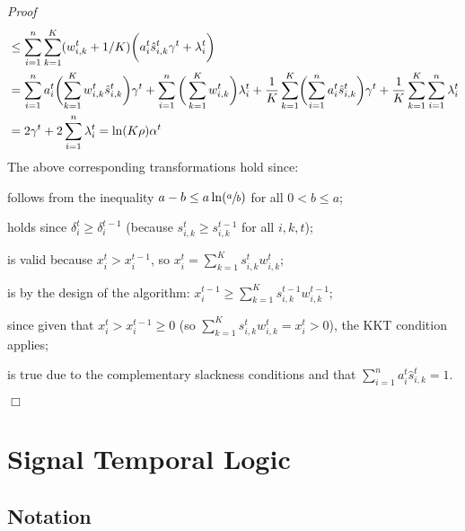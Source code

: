 \documentclass[a4paper]{article}
\newenvironment{proof}{\noindent\emph{Proof\ }}{\hspace*{\fill}$\Box$\medskip}
\begin{document}
\begin{proof}
\begin{align}
%
%
&\leq \sum_{i=1}^{n} \sum_{k=1}^{K} (w_{i,k}^{t} + 1/K) \biggl( a_{i}^{t} \hat{s}_{i,k}^{t} \gamma^t + \lambda_{i}^{t} \biggr) \notag \\
%
&= \sum_{i=1}^{n} a_{i}^{t} \biggl(\sum_{k=1}^{K} w_{i,k}^{t} \hat{s}_{i,k}^{t} \biggr) \gamma^t + \sum_{i=1}^{n} \bigg( \sum_{k=1}^{K} w_{i,k}^{t} \biggr) \lambda_{i}^{t}
+ \frac{1}{K}  \sum_{k=1}^{K} \biggl( \sum_{i=1}^{n} a_{i}^{t}  \hat{s}_{i,k}^{t}  \biggr) \gamma^t + \frac{1}{K} \sum_{k=1}^{K} \sum_{i=1}^{n} \lambda_{i}^{t} 		\notag \\
%
&= 2 \gamma^{t} + 2\sum_{i=1}^{n} \lambda_{i}^{t} = \ln(K \rho) \alpha^{t}
\end{align}
%
The above corresponding transformations hold since:
\begin{compactenum}[(1)]
	\setcounter{enumi}{1}
	\item follows from the inequality $a - b \leq a \ln(\sfrac{a}{b})$ for all $0 < b \leq a$;
	\item holds since $\delta_{i}^{t} \geq \delta_{i}^{t-1}$ (because $s_{i,k}^{t} \geq s_{i,k}^{t-1}$ for all $i,k,t$);
	\item is valid because $x_{i}^{t} > x_{i}^{t-1}$, so $x_{i}^{t} = \sum_{k=1}^{K}  s_{i,k}^{t} w_{i,k}^{t}$;
	\item is by the design of the algorithm: $x_{i}^{t-1} \geq \sum_{k=1}^{K}  s_{i,k}^{t-1} w_{i,k}^{t-1}$;
	\setcounter{enumi}{5}
	\item since given that $x_{i}^{t} > x_{i}^{t-1} \geq 0$
	(so $\sum_{k=1}^{K}  s_{i,k}^{t} w_{i,k}^{t} = x_{i}^{t} > 0$), the KKT condition applies;
	\item is true due to the complementary slackness conditions
		and that $\sum_{i=1}^{n} a_{i}^{t}  \hat{s}_{i,k}^{t} = 1$.
\end{compactenum}
\end{proof}

\clearpage

\section{Signal Temporal Logic}

\subsection{Notation}
\end{document}
